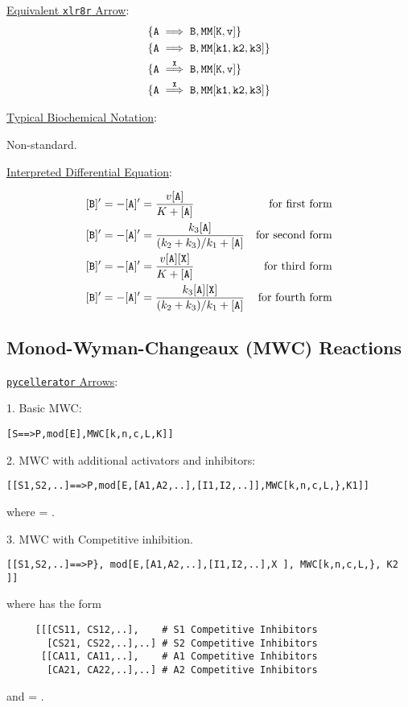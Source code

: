 \underline{Equivalent {\tt xlr8r} Arrow}: 
\begin{align*}
\{ {\tt A} &\implies {\tt B, MM[K,v]}\} \\
\{ {\tt A} &\implies {\tt B, MM[k1, k2, k3]}\} \\
\{ {\tt A} &\overset{\tt X}{\implies} {\tt B, MM[K,v]}\}\\
\{ {\tt A} &\overset{\tt X}{\implies} {\tt B, MM[k1, k2, k3]}\}
\end{align*}


\underline{Typical Biochemical Notation}: 

Non-standard. 

\underline{Interpreted Differential Equation}:

\begin{align*}
{\tt[B]'} &= -{\tt[A]'} = \dfrac{v{\tt[A]}}{K+{\tt[A]}} &\text{for first form}\\
{\tt[B]'} &= -{\tt[A]'} = \dfrac{k_3 {\tt[A]}}{(k_2+k_3)/k_1+{\tt[A]}} &\text{for second form}\\
{\tt[B]'} &= -{\tt[A]'} = \dfrac{v{\tt[A][X]}}{K+{\tt[A]}} &\text{for third form}\\
{\tt[B]'} &= -{\tt[A]'} = \dfrac{k_3{\tt[A][X]}}{(k_2+k_3)/k_1+{\tt[A]}} &\text{for fourth form}
\end{align*}

\subsection{Monod-Wyman-Changeaux (MWC) Reactions}
\label{subsection:MWC}
\underline{{\tt pycellerator} Arrows}:

1. Basic MWC:
\begin{lstlisting}
[S==>P,mod[E],MWC[k,n,c,L,K]]
\end{lstlisting}
2. MWC with additional activators and inhibitors:
\begin{lstlisting}
[[S1,S2,..]==>P,mod[E,[A1,A2,..],[I1,I2,..]],MWC[k,n,c,L,},K1]]
\end{lstlisting}
where  = \CODE{[[KS1,KS2,...],[KA1,KA1,..], [KI1,KI2,...]]}.

3. MWC with Competitive inhibition.
\begin{lstlisting}
[[S1,S2,..]==>P}, mod[E,[A1,A2,..],[I1,I2,..],X ], MWC[k,n,c,L,}, K2 ]]
\end{lstlisting}
where  has the form 
\begin{lstlisting}
     [[[CS11, CS12,..],    # S1 Competitive Inhibitors
       [CS21, CS22,..],..] # S2 Competitive Inhibitors
      [[CA11, CA11,..],    # A1 Competitive Inhibitors
       [CA21, CA22,..],..] # A2 Competitive Inhibitors
\end{lstlisting}
and =
.


